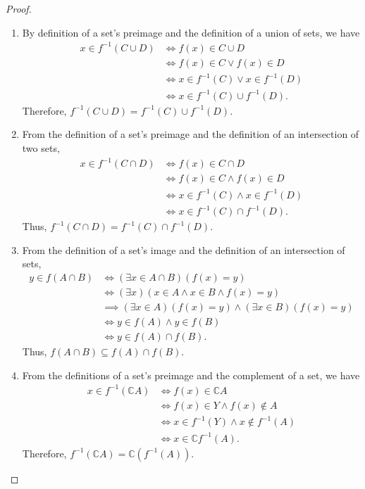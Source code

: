 \documentclass[12pt,a4paper]{article}
\theoremstyle{theorem}
\theoremstyle{definition}
\begin{document}
\begin{proof}
\begin{enumerate}
\item By definition of a set's preimage and the definition of a union of sets, we have
\begin{align*}
x \in f^{-1}(C \cup D) &\iff f(x) \in C \cup D \\
&\iff f(x) \in C \lor f(x) \in D \\
&\iff x \in f^{-1}(C) \lor x \in f^{-1}(D)\\
&\iff x \in f^{-1}(C) \cup f^{-1}(D) \text{.}
\end{align*}
Therefore,  $f^{-1}(C \cup D) = f^{-1}(C) \cup f^{-1}(D)$.
\item From the definition of a set's preimage and the definition of an intersection of two sets, 
\begin{align*}
x \in f^{-1}(C \cap D) &\iff f(x) \in C \cap D \\
&\iff f(x) \in C \land f(x) \in D \\
&\iff x \in f^{-1}(C) \land x \in f^{-1}(D)\\
&\iff x \in f^{-1}(C) \cap f^{-1}(D) \text{.}
\end{align*}
Thus,  $f^{-1}(C \cap D) = f^{-1}(C) \cap f^{-1}(D)$.
\item From the definition of a set's image and the definition of an intersection of sets,
\begin{align*}
y \in f(A \cap B) &\iff (\exists x \in A \cap B)(f(x) = y)\\
&\iff (\exists x)(x \in A \land x \in B \land f(x) = y)\\
&\implies (\exists x \in A)(f(x) = y) \land (\exists x \in B)(f(x) = y)\\
&\iff y \in f(A) \land y \in f(B)\\
&\iff y \in f(A) \cap f(B) \text{.}
\end{align*}
Thus,  $f(A \cap B) \subseteq f(A) \cap f(B)$.
\item From the definitions of a set's preimage and the complement of a set, we have
\begin{align*}
x \in f^{-1}(\mathbb{C} A) &\iff f(x) \in \mathbb{C} A \\
&\iff f(x) \in Y \land f(x) \not \in A\\
&\iff x \in f^{-1}(Y) \land x \not \in f^{-1}(A)\\
&\iff x \in \mathbb{C} f^{-1}(A) \text{.}
\end{align*}
Therefore,  $f^{-1}(\mathbb{C}A) = \mathbb{C} (f^{-1}(A))$.


\end{enumerate}
\end{proof}
\end{document}
